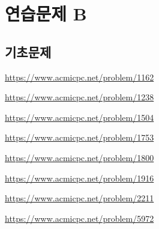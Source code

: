 \section{연습문제 B}

\subsection{기초문제}
\begin{problem} \url{https://www.acmicpc.net/problem/1162} \end{problem}
\begin{problem} \url{https://www.acmicpc.net/problem/1238} \end{problem}
\begin{problem} \url{https://www.acmicpc.net/problem/1504} \end{problem}
\begin{problem} \url{https://www.acmicpc.net/problem/1753} \end{problem}
\begin{problem} \url{https://www.acmicpc.net/problem/1800} \end{problem}
\begin{problem} \url{https://www.acmicpc.net/problem/1916} \end{problem}
\begin{problem} \url{https://www.acmicpc.net/problem/2211} \end{problem}
\begin{problem} \url{https://www.acmicpc.net/problem/5972} \end{problem}

